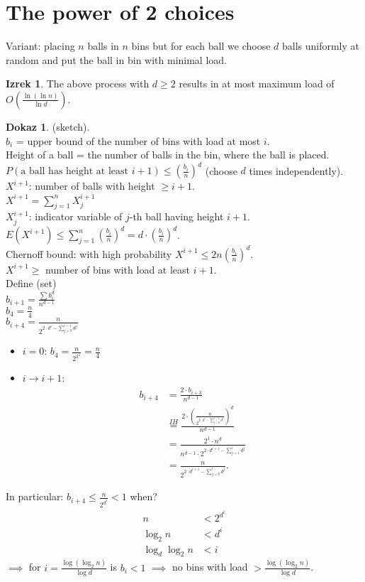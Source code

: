 \documentclass[a4paper, 12pt]{book}
\theoremstyle{definition}
\newtheorem{theorem}[counter]{Izrek}
\newtheorem{pro}[counter]{Dokaz}
\theoremstyle{remark}
\begin{document}
\section{The power of 2 choices}

Variant: placing $n$ balls in $n$ bins but for each ball we choose $d$ balls uniformly at random and
put the ball in bin with minimal load.
\begin{theorem}
  The above process with $d \geq 2$ results in at most maximum load of $O\left(\frac{\ln (\ln n)}{\ln d}\right)$.
\end{theorem}
\begin{pro}(sketch). \\
  $b_i$ = upper bound of the number of bins with load at most $i$. \\
  Height of a ball = the number of balls in the bin, where the ball is placed. \\
  $P(\text{a ball has height at least } i+1) \leq \left(\frac{b_i}{n}\right)^d$ (choose $d$ times independently). \\
  $X^{i+1}$: number of balls with height $ \geq i+1$. \\
  $X^{i+1} = \sum_{j=1}^{n} X_j^{i+1}$ \\
  $X_j^{i+1}$: indicator variable of $j$-th ball having height $i+1$. \\
  $E(X^{i+1}) \leq \sum_{j=1}^{n} \left(\frac{b_i}{n}\right)^d = d \cdot \left(\frac{b_i}{n}\right)^d$. \\
  Chernoff bound: with high probability $X^{i+1} \leq 2 n \left(\frac{b_i}{n}\right)^d$. \\
  $X^{i+1} \geq$ number of bins with load at least $i+1$. \\
  Define (set) \\
  $b_{i+1} = \frac{\sum b_i^d}{n^{d-1}}$ \\
  $b_4 = \frac{n}{4}$ \\
  $b_{i+4} = \frac{n}{2^{2 \cdot d^i - \sum_{j=0}^{i-1} d^j}}$
  \begin{itemize}[label={}]
    \item $i=0$: $b_4 = \frac{n}{2^{2^1}} = \frac{n}{4}$
    \item $i \to i+1$:
      \begin{align*}
        b_{i+4} &= \frac{2 \cdot b_{i+3}}{n^{d-1}} \\
        &\stackrel{IH}{=} \frac{2 \cdot \left(\frac{n}{2^{2 \cdot d^i - \sum_{j=0}^{i-1} d^j}}\right)^d}{n^{d-1}} \\
        &= \frac{2^1 \cdot n^d}{n^{d-1} \cdot 2^{2 \cdot d^{i+1} - \sum_{j=1}^{i} d^j}} \\
        &= \frac{n}{2^{2 \cdot d^{i+1} - \sum_{j=0}^{i} d^j}}.
      \end{align*}
  \end{itemize}
  In particular: $b_{i+4} \leq \frac{n}{2^{d^i}} < 1$ when?
  \begin{align*}
    n &< 2^{d^i} \\
    \log_2 n &< d^i \\
    \log_d \log_2 n &< i
  \end{align*}
  $\implies$ for $i = \frac{\log (\log_2 n)}{\log d}$ is $b_i < 1$ $\implies$ no bins with load
  $> \frac{\log (\log_2 n)}{\log d}$.
\end{pro}
\end{document}
